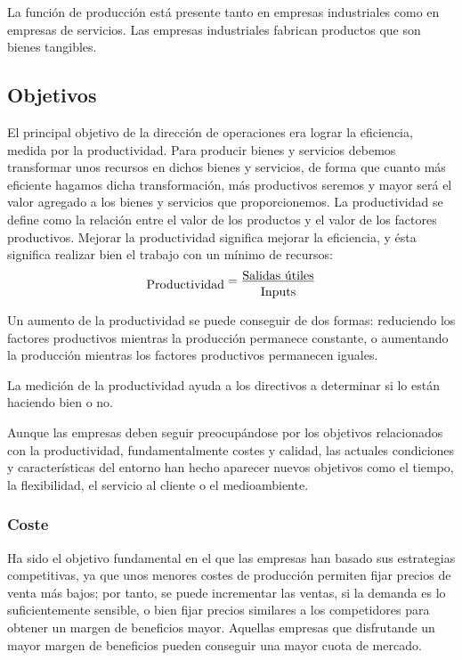 \documentclass[10pt,a4paper,spanish]{report}
\begin{document}
                  La función de producción está presente tanto en empresas industriales como en empresas de servicios. Las empresas industriales fabrican productos que son bienes tangibles.

            \subsection{\textcolor[rgb]{0.9,0.7,0.6}Objetivos}

                  El principal objetivo de la dirección de operaciones era lograr la eficiencia, medida por la productividad. Para producir bienes y servicios debemos transformar unos recursos en dichos bienes y servicios, de forma que cuanto más eficiente hagamos dicha transformación, más productivos seremos y mayor será el valor agregado a los bienes y servicios que proporcionemos. La productividad se define como la relación entre el valor de los productos y el valor de los factores productivos. Mejorar la productividad significa mejorar la eficiencia, y ésta significa realizar bien el trabajo con un mínimo de recursos:
                  \begin{equation}
                        \txt{Productividad}=\frac{\txt{Salidas útiles}}{\txt{Inputs}}
                  \end{equation}

                  Un aumento de la productividad se puede conseguir de dos formas: reduciendo los factores productivos mientras la producción permanece constante, o aumentando la producción mientras los factores productivos permanecen iguales.

                  La medición de la productividad ayuda a los directivos a determinar si lo están haciendo bien o no.

                  Aunque las empresas deben seguir preocupándose por los objetivos relacionados con la productividad, fundamentalmente costes y calidad, las actuales condiciones y características del entorno han hecho aparecer nuevos objetivos como el tiempo, la flexibilidad, el servicio al cliente o el medioambiente.

                  \subsubsection{\textcolor[rgb]{0.9,0.7,0.6}Coste}

                        Ha sido el objetivo fundamental en el que las empresas han basado sus estrategias competitivas, ya que unos menores costes de producción permiten fijar precios de venta más bajos; por tanto, se puede incrementar las ventas, si la demanda es lo suficientemente sensible, o bien fijar precios similares a los competidores para obtener un margen de beneficios mayor. Aquellas empresas que disfrutande un mayor margen de beneficios pueden conseguir una mayor cuota de mercado.
\end{document}
